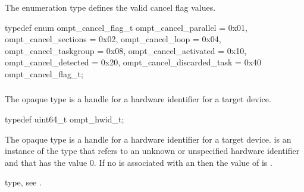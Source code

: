 \summary
The  enumeration type defines the valid cancel flag values.

\format
\begin{ccppspecific}
\begin{omptEnum}
typedef enum ompt_cancel_flag_t {
  ompt_cancel_parallel       = 0x01,
  ompt_cancel_sections       = 0x02,
  ompt_cancel_loop           = 0x04,
  ompt_cancel_taskgroup      = 0x08,
  ompt_cancel_activated      = 0x10,
  ompt_cancel_detected       = 0x20,
  ompt_cancel_discarded_task = 0x40
} ompt_cancel_flag_t;
\end{omptEnum}
\end{ccppspecific}



\subsubsection{}
\label{sec:ompt_hwid_t}

\summary
The  opaque type is a handle for a hardware identifier 
for a target device.

\format
\begin{ccppspecific}
\begin{omptOther}
typedef uint64_t ompt_hwid_t;
\end{omptOther}
\end{ccppspecific}

\descr

\label{sec:ompt_hwid_none}
The  opaque type is a handle for a hardware identifier for 
a target device.  is an instance of the type that refers 
to an unknown or unspecified hardware identifier and that has the value 0. If 
no  is associated with an  then the 
value of  is .

\begin{crossrefs}
\item {} type, 
see .
\end{crossrefs}


